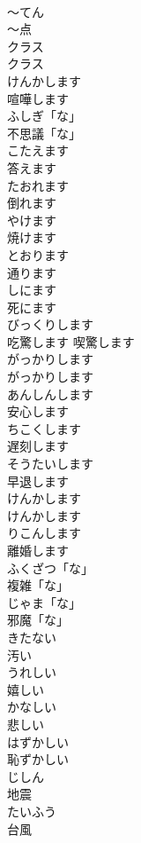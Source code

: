 \documentclass[8pt]{extreport}
\begin{document}
\begin{CJK}{UTF8}{min}
\\	〜てん	
\\	〜点		
\\	クラス	
\\	クラス		
\\	けんかします	
\\	喧嘩します		
\\	ふしぎ「な」	
\\	不思議「な」		
\\	こたえます	
\\	答えます	
\\	たおれます	
\\	倒れます	
\\	やけます	
\\	焼けます		
\\	とおります	
\\	通ります	
\\	しにます	
\\	死にます	
\\	びっくりします	
\\	吃驚します 喫驚します	
\\	がっかりします	
\\	がっかりします	
\\	あんしんします	
\\	安心します	
\\	ちこくします	
\\	遅刻します	
\\	そうたいします	
\\	早退します		
\\	けんかします	
\\	けんかします		
\\	りこんします	
\\	離婚します		
\\	ふくざつ「な」	
\\	複雑「な」	
\\	じゃま「な」	
\\	邪魔「な」	
\\	きたない	
\\	汚い		
\\	うれしい	
\\	嬉しい	
\\	かなしい	
\\	悲しい		
\\	はずかしい	
\\	恥ずかしい	
\\	じしん	
\\	地震	
\\	たいふう	
\\	台風	

\end{CJK}
\end{document}
